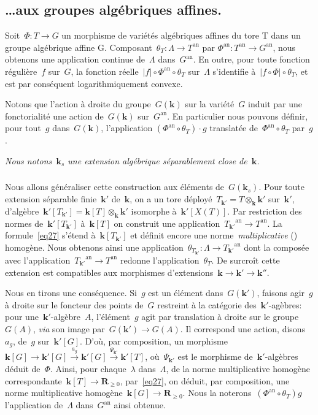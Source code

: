 \documentclass[french]{amsart}
\newcommand{\kk}{\mathbf{k}}
\newcommand{\abs}[1]{{\left|{#1}\right|}}
\newcommand{\an}{\textrm{an}}
\newcommand{\R}{\mathbf{R}}
\newcommand{\tens}{\mathop{\otimes}}
\begin{document}
\subsection{\ldots aux groupes algébriques affines.}\label{sectionD4}

Soit~$\Phi: T \to G$ un morphisme de
variétés algébriques affines du tore T dans un groupe algébrique affine G. Composant~$\theta_T : \Lambda \rightarrow T^\an$ par $\Phi^\an: T^\an \rightarrow G^\an$, nous obtenons une application continue
de~$\Lambda$ dans~$G^\an$. En outre, pour toute fonction régulière~$f$ sur~$G$, la fonction
réelle~$\abs{f}\circ\Phi^\an \circ\theta_T$ sur~$\Lambda$ s'identifie à~$\abs{f \circ\Phi}\circ\theta_T$, et est par conséquent logarithmiquement
convexe.

Notons que l'action à droite du groupe~$G(\kk)$ sur la variété~$G$ induit par une fonctorialité une action de~$G(\kk)$ sur~$G^\an$. En particulier nous pouvons définir, pour tout~$g$ dans~$G(\kk)$, l'application $(\Phi^\an \circ \theta_T )\cdot g$ translatée de~$\Phi^\an \circ\theta_T$ par~$g$.

\emph{Nous notons~$\kk_s$ une extension algébrique séparablement close de~$\kk$.}
\subsubsection{}\label{sectionD41}
Nous allons généraliser cette construction aux éléments de~$G(\kk_s)$.
Pour toute extension séparable finie~$\kk'$ de~$\kk$, on a un tore déployé~$T_{\kk'}=T\tens_\kk\kk'$ sur~$\kk'$, d'algèbre~$\kk'[T_{\kk'}]=\kk[T ] \tens_\kk\kk'$ isomorphe à~$\kk'[X(T)]$. Par restriction des normes de~$\kk'[T_{\kk'}]$ à~$\kk[T]$ on construit une application~${T_{\kk'}}^\an\to T^\an$. La formule~\eqref{eq27} s'étend à~$\kk[T_{\kk'}]$ et définit encore une norme~\emph{multiplicative} (\cite[2.1 (p.~21)]{Ber90}) homogène.
Nous obtenons ainsi une application~$\theta_{T_{\kk'}}:\Lambda\to {T_{\kk'}}^\an$ dont la composée avec l'application~${T_{\kk'}}^\an\to T^\an$ redonne l'application~$\theta_T$. De surcroît cette extension est compatibles aux morphismes d'extensions~$\kk\to\kk'\to\kk''$.

Nous en tirons une conséquence. Si~$g$ est un élément dans~$G(\kk')$, faisons agir~$g$ à droite sur le foncteur des points de~$G$ restreint à la catégorie des~$\kk'$-agèbres: pour une~$\kk'$-algèbre~$A$, l'élément~$g$ agit par translation à droite sur le groupe~$G(A)$, \emph{via} son image par~$G(\kk')\to G(A)$. Il correspond une action, disons~$a_g$, de~$g$ sur~$\kk'[G]$. D'où, par composition, un morphisme~$\kk[G]\to\kk'[G]\xrightarrow{a_g}\kk'[G]\xrightarrow{\Psi_{\kk'}}\kk'[T]$, où~$\Psi_{\kk'}$ est le morphisme de~$\kk'$-algèbres déduit de~$\Phi$. Ainsi, pour chaque~$\lambda$ dans~$\Lambda$, de la norme multiplicative homogène correspondante~$\kk[T]\to\R_{\geq0}$, par~\eqref{eq27}, on déduit, par composition, une norme multiplicative homogène~$\kk[G]\to\R_{\geq0}$.
Nous la noterons~$(\Phi^\an\circ\theta_T)g$ l'application de~$\Lambda$ dans~$G^\an$ ainsi obtenue.
\end{document}
